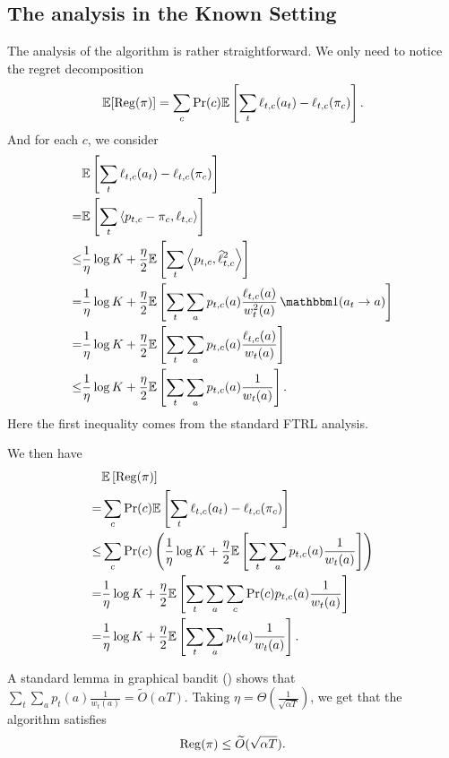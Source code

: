 \subsection{The analysis in the Known Setting}
The analysis of the algorithm is rather straightforward. We only need to notice the regret decomposition
\[\mathbb{E}[\operatorname{\mathrm{Reg}}(\pi)] = \sum_c \Pr(c) \mathbb{E}\left[\sum_t \ell_{t,c}(a_t) - \ell_{t,c}(\pi_c)\right].\]
And for each $c$, we consider
\begin{align*}
    &\E\left[\sum_t \ell_{t,c}(a_t) - \ell_{t,c}(\pi_c)\right]\\
%
   =& \E\left[\sum_t \ip{p_{t,c} - \pi_c,\ell_{t,c}} \right]\\
%
   \le& \frac{1}{\eta} \log K + \frac{\eta}{2} \E\left[\sum_t \ip{p_{t,c}, \widehat{\ell}_{t,c}^2} \right]  \\
   =& \frac{1}{\eta} \log K + \frac{\eta}{2} \E\left[\sum_t \sum_a p_{t,c}(a) \frac{\ell_{t,c}(a)}{w^2_t(a)} \indi(a_t \rightarrow a)  \right] \\
    =&     \frac{1}{\eta} \log K + \frac{\eta}{2} \E\left[\sum_t \sum_a p_{t,c}(a) \frac{\ell_{t,c}(a)}{w_t(a)}  \right] \\
    \le& \frac{1}{\eta} \log K + \frac{\eta}{2} \E\left[\sum_t \sum_a p_{t,c}(a) \frac{1}{w_t(a)}  \right] .
\end{align*}
Here the first inequality comes from the standard FTRL analysis.

We then have
\begin{align*}
    &\E\left[\Reg(\pi)\right]\\
    =& \sum_c \Pr(c) \E\left[\sum_t \ell_{t,c}(a_t) - \ell_{t,c}(\pi_c)\right]\\
%
    \le& \sum_c \Pr(c)  \left(  \frac{1}{\eta} \log K + \frac{\eta}{2} \E\left[\sum_t \sum_a p_{t,c}(a) \frac{1}{w_t(a)}  \right] \right) \\
% 
    =&  \frac{1}{\eta} \log K  + \frac{\eta}{2}  \E\left[\sum_t \sum_a \sum_c \Pr(c) p_{t,c}(a) \frac{1}{w_t(a)}    \right]\\
    =& \frac{1}{\eta} \log K  + \frac{\eta}{2}  \E\left[\sum_t \sum_a p_{t}(a)  \frac{1}{w_t(a)} \right] .
\end{align*}

A standard lemma in graphical bandit () shows that $\sum_t \sum_a p_{t}(a)  \frac{1}{w_t(a)} = \widetilde{O}(\alpha T)$. Taking $\eta = \Theta(\frac{1}{\sqrt{\alpha T}})$, we get that the algorithm satisfies
\[\operatorname{\mathrm{Reg}}(\pi) \le \widetilde{O}(\sqrt{\alpha T}).\]